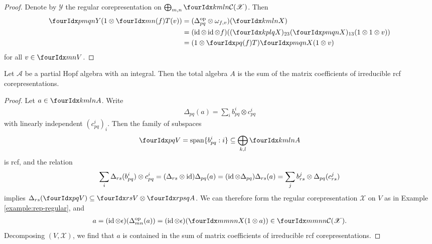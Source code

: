 \begin{proof}
  Denote by $\mathscr{Y}$ the regular corepresentation on
  $\bigoplus_{m,n } \Gr{\mathcal{C}(\mathscr{X})}{k}{l}{m}{n}$. Then
  \begin{align*}
    \label{eq:1}
 \Gr{Y}{p}{q}{m}{n}    (1\otimes \Gr{T}{m}{n}{}{(f)}(v)) &= 
(\Delta^{\op}_{pq} \otimes \omega_{f,v})( \Gr{X}{k}{l}{m}{n}) 
\\ & = (\id \otimes \id \otimes
f)((\Gr{X}{k}{l}{p}{q})_{23}(\Gr{X}{p}{q}{m}{n})_{13}(1 \otimes 1
 \otimes v)) \\ &=(1 \otimes \Gr{T}{p}{q}{}{(f)})\Gr{X}{p}{q}{m}{n}(1 \otimes v)
  \end{align*}
for all $v \in \Gru{V}{m}{n}$.
\end{proof}
\begin{Prop} \label{prop:rep-weak-pw} Let $\mathscr{A}$ be a partial
  Hopf algebra with an integral. Then the total algebra $A$ is the sum
  of the matrix coefficients of irreducible rcf corepresentations.
\end{Prop}
\begin{proof} 
  Let $a \in \Gr{A}{k}{l}{m}{n}$. Write
  \begin{align*}
    \Delta_{pq}(a)=\sum_{i} b_{pq}^{i} \otimes c^{i}_{pq}
  \end{align*}
 with linearly independent
  $(c_{pq}^{i})_{i}$. Then the family of subspaces
  \begin{align*}
    \Gru{V}{p}{q} = \mathrm{span}\{b_{pq}^{i} : i \}\subseteq \bigoplus_{k,l}
  \Gr{A}{k}{l}{m}{n}
  \end{align*}
is rcf, and the relation
  \begin{align*}
 \sum_{i}
    \Delta_{rs}(b^{i}_{pq}) \otimes c^{i}_{pq} =
    (\Delta_{rs} \otimes \operatorname{id})\Delta_{pq}(a) = (\operatorname{id} \otimes
    \Delta_{pq}) \Delta_{rs}(a) = \sum_{j} b^{j}_{rs} \otimes
    \Delta_{pq}(c^{j}_{rs})
  \end{align*}
  implies $\Delta_{rs}(\Gru{V}{p}{q}) \subseteq \Gru{V}{r}{s} \otimes
  \Gr{A}{r}{s}{p}{q}$.  We can therefore form the regular
  corepresentation $\mathscr{X}$ on $V$ as in Example \ref{example:rep-regular}, and
  \begin{align*}
    a = (\id \otimes \epsilon)(\Delta^{\op}_{mn}(a)) =
    (\id \otimes \epsilon)(\Gr{X}{m}{n}{m}{n}(1 \otimes a)) \in
    \Gr{\mathcal{C}(\mathscr{X})}{m}{n}{m}{n}.
  \end{align*}
  Decomposing $(V,\mathscr{X})$, we find that
  $a$ is contained in the sum of matrix coefficients of irreducible
rcf  corepresentations.
\end{proof}


